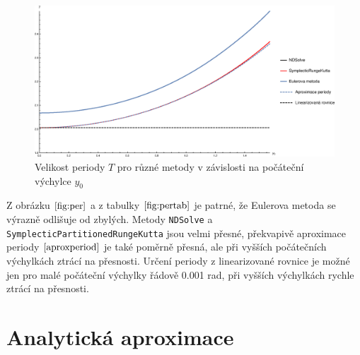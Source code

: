 \begin{figure}[h]
  \centering
  \includegraphics[width=17cm]{figures/PER2+LIN.eps}
  \caption{Velikost periody $T$ pro různé metody v závislosti na počáteční výchylce $y_{0}$}
  \label{fig:per}
\end{figure}

Z obrázku $\eqref{fig:per}$ a z tabulky $\eqref{fig:pertab}$ je patrné, že Eulerova metoda se výrazně odlišuje od zbylých. Metody \texttt{NDSolve} a \texttt{SymplecticPartitionedRungeKutta} jsou velmi přesné, překvapivě aproximace periody $\eqref{aproxperiod}$ je také poměrně přesná, ale při vyšších počátečních výchylkách ztrácí na přesnosti. Určení periody z linearizované rovnice je možné jen pro malé počáteční výchylky řádově 0.001 \si{rad}, při vyšších výchylkách rychle ztrácí na přesnosti.

\section{Analytická aproximace}
\label{sec:Analytická aproximace}

